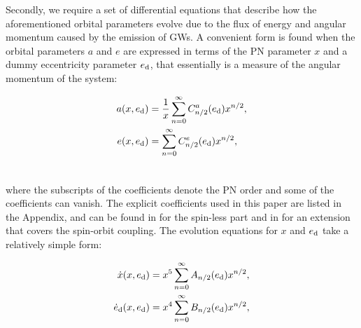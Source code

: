 \documentclass[usenatbib]{mnras}
\begin{document}
Secondly, we require a set of differential equations that describe how the aforementioned orbital parameters evolve due to the flux of energy and angular momentum caused by the emission of GWs. A convenient form is found when the orbital parameters $a$ and $e$ are expressed in terms of the PN parameter $x$ and a dummy eccentricity parameter $e_{\rm d}$, that essentially is a measure of the angular momentum of the system:

\begin{align}
a(x,e_{\rm d}) &= \frac{1}{x} \sum_{n=0}^{\infty} C_{n/2}^{a}(e_{\rm d}) x^{n/2}, \label{eq:a_series}\\
e(x,e_{\rm d}) &= \sum_{n=0}^{\infty} C_{n/2}^{e}(e_{\rm d}) x^{n/2}, \label{eq:e_series} \\ \nonumber
\end{align}

\noindent where the subscripts of the coefficients denote the PN order and some of the coefficients can vanish. The explicit coefficients used in this paper are listed in the Appendix, and can be found in \cite{Memmesheimer} for the spin-less part and in \cite{jetzer} for an extension that covers the spin-orbit coupling. The evolution equations for $x$ and $e_{\rm d}$ take a relatively simple form:

\begin{align}
\dot{x}(x,e_{\rm d}) &= x^5 \sum_{n=0}^{\infty} A_{n/2}(e_{\rm d}) x^{n/2}, \label{eq:xdot_series}\\
\dot{e}_{\rm d}(x,e_{\rm d}) &= x^4 \sum_{n=0}^{\infty} B_{n/2}(e_{\rm d}) x^{n/2},  \label{eq:eddot_series} \\ \nonumber
\end{align}
\end{document}
